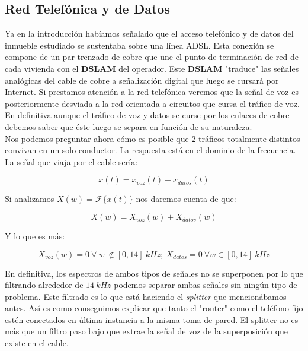 \documentclass{article}[12 pt]
\begin{document}
		\subsection{Red Telefónica y de Datos}
			Ya en la introducción habíamos señalado que el acceso telefónico y de datos del inmueble estudiado se sustentaba sobre una línea ADSL. Esta conexión se compone de un par trenzado de cobre que une el punto de terminación de red de cada vivienda con el \textbf{DSLAM} del operador. Este \textbf{DSLAM} "traduce" las señales analógicas del cable de cobre a señalización digital que luego se cursará por Internet. Si prestamos atención a la red telefónica veremos que la señal de voz es posteriormente desviada a la red orientada a circuitos que cursa el tráfico de voz. En definitiva aunque el tráfico de voz y datos se curse por los enlaces de cobre debemos saber que éste luego se separa en función de su naturaleza.\\

			Nos podemos preguntar ahora cómo es posible que 2 tráficos totalmente distintos convivan en un solo conductor. La respuesta está en el dominio de la frecuencia. La señal que viaja por el cable sería:

			$$x(t) = x_{voz}(t) + x_{datos}(t)$$

			Si analizamos $X(w) = \mathcal{F}\{x(t)\}$ nos daremos cuenta de que:

			$$X(w) = X_{voz}(w) + X_{datos}(w)$$

			Y lo que es más:

			$$X_{voz}(w) = 0\ \forall \ w \ \notin [0, 14]\ kHz;\ X_{datos} = 0\ \forall w \in [0, 14]\ kHz$$

			En definitiva, los espectros de ambos tipos de señales no se superponen por lo que filtrando alrededor de $14\ kHz$ podemos separar ambas señales sin ningún tipo de problema. Este filtrado es lo que está haciendo el \textit{splitter} que mencionábamos antes. Así es como conseguimos explicar que tanto el "router" como el teléfono fijo estén conectados en última instancia a la misma toma de pared. El splitter no es más que un filtro paso bajo que extrae la señal de voz de la superposición que existe en el cable.\\
\end{document}
